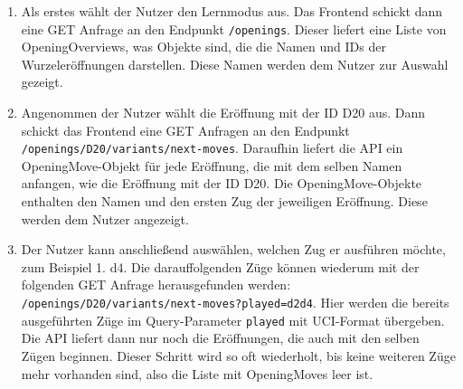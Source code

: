 \begin{enumerate}
     \item Als erstes wählt der Nutzer den Lernmodus aus. Das Frontend schickt dann eine GET Anfrage an den Endpunkt \lstinline{/openings}. Dieser liefert eine Liste von OpeningOverviews, was Objekte sind, die die Namen und IDs der Wurzeleröffnungen darstellen. Diese Namen werden dem Nutzer zur Auswahl gezeigt.
     \item Angenommen der Nutzer wählt die Eröffnung mit der ID D20 aus. Dann schickt das Frontend eine GET Anfragen an den Endpunkt \lstinline|/openings/D20/variants/next-moves|. Daraufhin liefert die API ein OpeningMove-Objekt für jede Eröffnung, die mit dem selben Namen anfangen, wie die Eröffnung mit der ID D20. Die OpeningMove-Objekte enthalten den Namen und den ersten Zug der jeweiligen Eröffnung. Diese werden dem Nutzer angezeigt.
     \item Der Nutzer kann anschließend auswählen, welchen Zug er ausführen möchte, zum Beispiel 1. d4. Die darauffolgenden Züge können wiederum mit der folgenden GET Anfrage herausgefunden werden: \lstinline|/openings/D20/variants/next-moves?played=d2d4|. Hier werden die bereits ausgeführten Züge im Query-Parameter \lstinline{played} mit \ac{UCI}-Format übergeben. Die API liefert dann nur noch die Eröffnungen, die auch mit den selben Zügen beginnen. Dieser Schritt wird so oft wiederholt, bis keine weiteren Züge mehr vorhanden sind, also die Liste mit OpeningMoves leer ist.
\end{enumerate}


